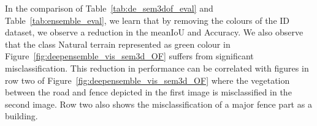     \begin{table}[h!]
        \caption{Illustration of performance of RandLA-Net on Semantic3D without colour over number of ensembles. meanIOU, IOU per-class and overall accuracy are represented here.
        C1 to C8 are the classes of Semantic3D which are Manmade terrain, Natural terrain, High vegetation, Low vegetation, Buildings, Hardscapes, Scanning artifacts, and Cars.}
        \label{tab:de_sem3dof_eval}
    \end{table}
    In the comparison of Table~\ref{tab:de_sem3dof_eval} and Table~\ref{tab:ensemble_eval}, we learn that by removing the colours of the ID dataset, we observe a reduction in the meanIoU and Accuracy.
    We also observe that the class Natural terrain represented as green colour in Figure~\ref{fig:deepensemble_vis_sem3d_OF} suffers from significant misclassification.
    This reduction in performance can be correlated with figures in row two of Figure~\ref{fig:deepensemble_vis_sem3d_OF} where the vegetation between the road and fence depicted in the first image is misclassified in the second image.
    Row two also shows the misclassification of a major fence part as a building.

